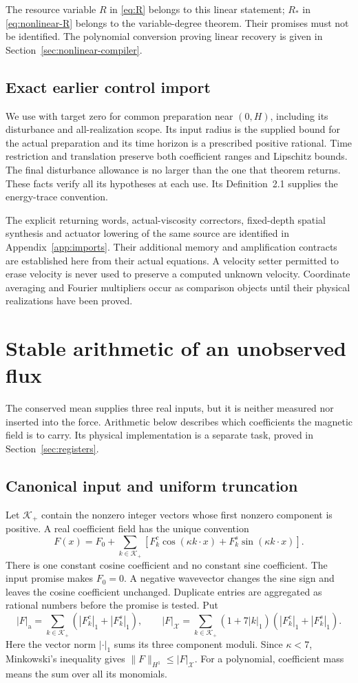 \documentclass[11pt,a4paper]{amsart}
\theoremstyle{definition}
\theoremstyle{remark}
\numberwithin{equation}{section}
\newcommand{\norm}[1]{\lVert #1\rVert}
\begin{document}
The resource variable $R$ in \eqref{eq:R} belongs to this linear statement;
$R_*$ in \eqref{eq:nonlinear-R} belongs to the variable-degree theorem.
Their promises must not be identified. The polynomial conversion proving
linear recovery is given in Section~\ref{sec:nonlinear-compiler}.

\subsection{Exact earlier control import}
We use \cite[Theorem~2.2]{Common} with target zero for common preparation
near $(0,H)$, including its disturbance and all-realization scope. Its input
radius is the supplied bound for the actual preparation and its time horizon
is a prescribed positive rational. Time restriction and translation preserve
both coefficient ranges and Lipschitz bounds. The final disturbance allowance
is no larger than the one that theorem returns. These facts verify all its
hypotheses at each use. Its Definition~2.1 supplies the energy-trace convention.

The explicit returning words, actual-viscosity correctors, fixed-depth
spatial synthesis and actuator lowering of the same source are identified
in Appendix~\ref{app:imports}. Their additional memory and amplification
contracts are established here from their actual equations. A velocity
setter permitted to erase velocity is never used to preserve a computed
unknown velocity. Coordinate averaging and Fourier multipliers occur as
comparison objects until their physical realizations have been proved.

\section{Stable arithmetic of an unobserved flux}\label{sec:arithmetic}
The conserved mean supplies three real inputs, but it is neither measured nor
inserted into the force.  Arithmetic below describes which coefficients the
magnetic field is to carry.  Its physical implementation is a separate task,
proved in Section~\ref{sec:registers}.

\subsection{Canonical input and uniform truncation}
Let $\mathcal K_+$ contain the nonzero integer vectors whose first nonzero
component is positive.  A real coefficient field has the unique convention
\[
 F(x)=F_0+\sum_{k\in\mathcal K_+}
       [F_k^c\cos(\kappa k\cdot x)+F_k^s\sin(\kappa k\cdot x)].
\]
There is one constant cosine coefficient and no constant sine coefficient.
The input promise makes $F_0=0$. A negative wavevector changes the sine sign
and leaves the cosine coefficient unchanged. Duplicate entries are aggregated
as rational numbers before the promise is tested. Put
\[
 |F|_{\mathrm a}=\sum_{k\in\mathcal K_+}(|F_k^c|_1+|F_k^s|_1),\qquad
 |F|_{\mathcal X}=\sum_{k\in\mathcal K_+}(1+7|k|_1)
                    (|F_k^c|_1+|F_k^s|_1).
\]
Here the vector norm $|\cdot|_1$ sums its three component moduli. Since
$\kappa<7$, Minkowski's inequality gives $\norm F_{H^1}\le |F|_{\mathcal X}$.
For a polynomial, coefficient mass means the sum over all its monomials.
\end{document}
